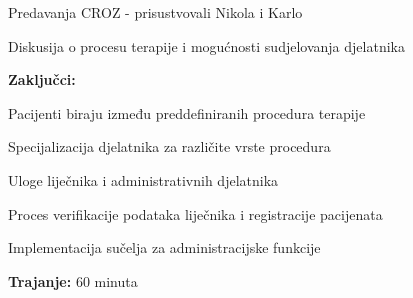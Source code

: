 \begin{packed_enum}
\begin{packed_item}
\begin{packed_item}
\begin{packed_item}
                                \item Predavanja CROZ - prisustvovali Nikola i Karlo
                                \item Diskusija o procesu terapije i mogućnosti sudjelovanja djelatnika
                            \end{packed_item}
                        \item \textbf{Zaključci:}
                            \begin{packed_item}
                                \item Pacijenti biraju između preddefiniranih procedura terapije
                                \item Specijalizacija djelatnika za različite vrste procedura
                                \item Uloge liječnika i administrativnih djelatnika
                                \item Proces verifikacije podataka liječnika i registracije pacijenata
                                \item Implementacija sučelja za administracijske funkcije
                            \end{packed_item}
                        \item \textbf{Trajanje:} 60 minuta
                    \end{packed_item}
            \end{packed_item}
            
\vspace{30pt}


\end{packed_enum}
